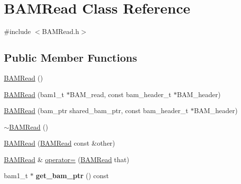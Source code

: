 \hypertarget{class_b_a_m_read}{
\section{BAMRead Class Reference}
\label{class_b_a_m_read}
}


{\ttfamily \#include $<$BAMRead.h$>$}

\subsection*{Public Member Functions}
\begin{DoxyCompactItemize}
\item 
\hyperlink{class_b_a_m_read_a2941b759b5655356a4ca02760dc6ca5e}{BAMRead} ()
\item 
\hyperlink{class_b_a_m_read_a946460d3c95417f5d7071afde2e9bdeb}{BAMRead} (bam1\_\-t $\ast$BAM\_\-read, const bam\_\-header\_\-t $\ast$BAM\_\-header)
\item 
\hyperlink{class_b_a_m_read_ae60c749028e839956b8b256357e3aebf}{BAMRead} (bam\_\-ptr shared\_\-bam\_\-ptr, const bam\_\-header\_\-t $\ast$BAM\_\-header)
\item 
\hyperlink{class_b_a_m_read_a88ae0799815e3e930e773a5717aad0fb}{$\sim$BAMRead} ()
\item 
\hyperlink{class_b_a_m_read_ac07560ff3a2d6c645774e72605e85439}{BAMRead} (\hyperlink{class_b_a_m_read}{BAMRead} const \&other)
\item 
\hyperlink{class_b_a_m_read}{BAMRead} \& \hyperlink{class_b_a_m_read_a6d1e8f2f083126575ef2fb3ae0662af9}{operator=} (\hyperlink{class_b_a_m_read}{BAMRead} that)
\item 
\hypertarget{class_b_a_m_read_a81d2bbea4473e61c95129798c6955706}{
bam1\_\-t $\ast$ {\bfseries get\_\-bam\_\-ptr} () const }
\label{class_b_a_m_read_a81d2bbea4473e61c95129798c6955706}


\end{DoxyCompactItemize}
